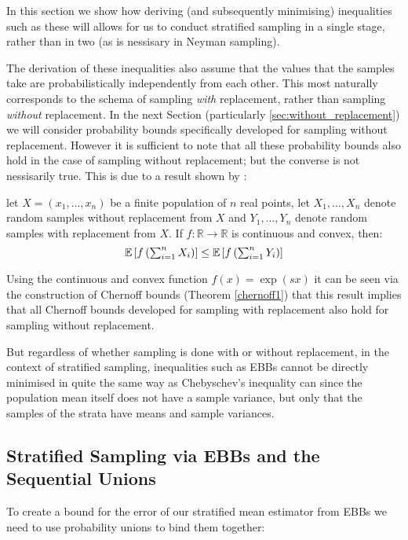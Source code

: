 In this section we show how deriving (and subsequently minimising) inequalities such as these will allows for us to conduct stratified sampling in a single stage, rather than in two (as is nessisary in Neyman sampling).

The derivation of these inequalities also assume that the values that the samples take are probabilistically independently from each other.  This most naturally corresponds to the schema of sampling \textit{with} replacement, rather than sampling \textit{without} replacement.
In the next Section (particularly \ref{sec:without_replacement}) we will consider probability bounds specifically developed for sampling without replacement. However it is sufficient to note that all these probability bounds also hold in the case of sampling without replacement; but the converse is not nessisarily true. 
This is due to a result shown by \cite{hoeffding1}:

\begin{lemma}\label{hoeffdings_reduction}
let $X=(x_1,\dots,x_n)$ be a finite population of $n$ real points, let $X_1,\dots,X_n$ denote random samples without replacement from $X$ and $Y_1,\dots,Y_n$ denote random samples with replacement from $X$. 
If $f:\mathbb{R}\rightarrow\mathbb{R}$ is continuous and convex, then:
$$\textstyle \operatorname{\mathbb{E}}\left[f\left(\sum_{i=1}^nX_i\right)\right]\le\operatorname{\mathbb{E}}\left[f\left(\sum_{i=1}^nY_i\right)\right] $$
\end{lemma}

Using the continuous and convex function $f(x)=\exp(sx)$ it can be seen via the construction of Chernoff bounds (Theorem \ref{chernoff1}) that this result implies that all Chernoff bounds developed for sampling with replacement also hold for sampling without replacement.

But regardless of whether sampling is done with or without replacement, in the context of stratified sampling, inequalities such as EBBs cannot be directly minimised in quite the same way as Chebyschev's inequality can since the population mean itself does not have a sample variance, but only that the samples of the strata have means and sample variances.

\subsection{Stratified Sampling via EBBs and the Sequential Unions}

To create a bound for the error of our stratified mean estimator from EBBs we need to use probability unions to bind them together:

